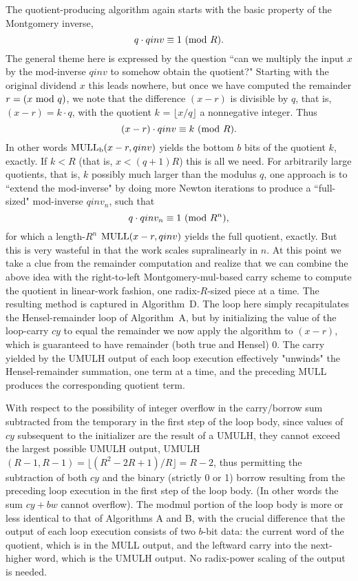 \documentclass{article}
\begin{document}
The quotient-producing algorithm again starts with the basic property of the Montgomery inverse,
$$
	q \cdot qinv \equiv 1\ ({\rm mod}\ R).
$$
The general theme here is expressed by the question ``can we multiply the input $x$ by the mod-inverse $qinv$ to somehow obtain the quotient?" Starting with the original dividend $x$ this leads nowhere, but once we have computed the remainder $r = (x\ {\rm mod}\ q)$, we note that the difference $(x - r)$ is divisible by $q$, that is, $(x - r) = k \cdot q$, with the quotient $k$ = $\lfloor x/q \rfloor$ a nonnegative integer. Thus
$$
	(x - r) \cdot qinv \equiv k\ ({\rm mod}\ R) .
$$
In other words ${\rm MULL_b}(x - r, qinv)$ yields the bottom $b$ bits of the quotient $k$, exactly. If $k < R$ (that is, $x < (q + 1)R$) this is all we need. For arbitrarily large quotients, that is, $k$ possibly much larger than the modulus $q$, one approach is to ``extend the mod-inverse" by doing more Newton iterations to produce a ``full-sized" mod-inverse $qinv_n$, such that
$$
	q \cdot qinv_n \equiv 1\ ({\rm mod}\ R^n),
$$
for which a length-$R^n$ ${\rm MULL}(x - r, qinv)$ yields the full quotient, exactly. But this is very wasteful in that the work scales supralinearly in $n$. At this point we take a clue from the remainder computation and realize that we can combine the above idea with the right-to-left Montgomery-mul-based carry scheme to compute the quotient in linear-work fashion, one radix-$R$-sized piece at a time. The resulting method is captured in Algorithm~D. The loop here simply recapitulates the Hensel-remainder loop of Algorithm~A, but by initializing the value of the loop-carry $cy$ to equal the remainder we now apply the algorithm to $(x - r)$, which is guaranteed to have remainder (both true and Hensel) 0. The carry yielded by the UMULH output of each loop execution effectively "unwinds" the Hensel-remainder summation, one term at a time, and the preceding MULL produces the corresponding quotient term.

With respect to the possibility of integer overflow in the carry/borrow sum subtracted from the temporary in the first step of the loop body, since values of $cy$ subsequent  to the initializer are the result of a UMULH, they cannot exceed the largest possible UMULH output, UMULH$(R-1, R-1) = \lfloor (R^2 - 2R + 1)/R \rfloor = R-2$, thus permitting the subtraction of both $cy$ and the binary (strictly 0 or 1) borrow resulting from the preceding loop execution in the first step of the loop body. (In other words the sum $cy + bw$ cannot overflow). The modmul portion of the loop body is more or less identical to that of Algorithms A and B, with the crucial difference that the output of each loop execution consists of two $b$-bit data: the current word of the quotient, which is in the MULL output, and the leftward carry into the next-higher word, which is the UMULH output. No radix-power scaling of the output is needed.
\vspace{0.1in}
\end{document}
